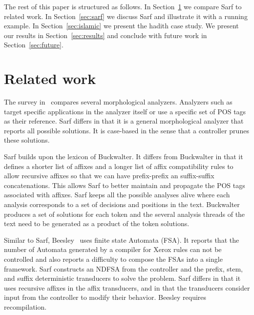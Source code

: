 \documentclass[11pt]{article}
\begin{document}

The rest of this paper is structured as follows. In Section~\ref{sec:related}
we compare Sarf to related work. In Section~\ref{sec:sarf}
we discuss Sarf and illustrate it with a running example.
In Section~\ref{sec:islamic} we present the hadith case
study. We present our results in Section~\ref{sec:results}
and conclude with future work in Section~\ref{sec:future}.


\section{Related work }
\label{sec:related}

The survey in~\cite{Sughaiyer:04} compares
several morphological analyzers. 
Analyzers such as~\cite{Khoja:01,Darwish:02} 
target specific applications in the 
analyzer itself or use a specific set of POS tags
as their reference.
Sarf differs in that it is a general morphological 
analyzer that reports all possible solutions. 
It is case-based in the sense that a controller 
prunes these solutions. 

Sarf builds upon the lexicon of Buckwalter.
It differs from Buckwalter in that it defines a shorter list of affixes
and a longer list of affix compatibility rules to allow recursive 
affixes so that we can have prefix-prefix an suffix-suffix 
concatenations.
This allows Sarf to better maintain and propagate 
the POS tags associated with affixes. 
Sarf keeps all the possible analyses alive where each analysis
corresponds to a set of decisions and positions in the text. 
Buckwalter produces a set of solutions for each token 
and the several analysis threads of the text need to be 
generated as a product of the token solutions. 

Similar to Sarf, Beesley~ uses
finite state Automata (FSA). 
It reports that the number of Automata generated by a compiler
for Xerox rules can not be controlled and also reports a difficulty 
to compose the FSAs into a single framework. 
Sarf constructs an NDFSA from
the controller and the prefix, stem, and suffix deterministic 
transducers to solve the problem.
Sarf differs in that it uses recursive affixes in the 
affix transducers, and in that the transducers consider
input from the controller to modify their behavior. 
Beesley requires recompilation.%
\end{document}
